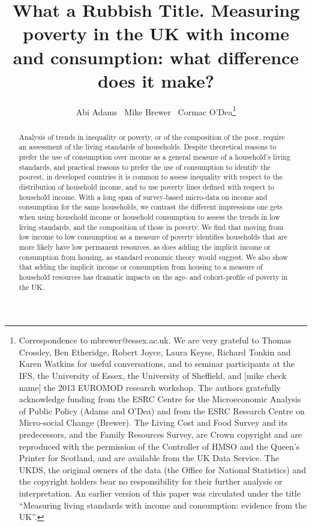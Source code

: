 \documentclass[11pt]{article} %
\title{What a Rubbish Title. Measuring poverty in the UK with income and consumption: what difference does it make?}
\author{Abi Adams \ Mike Brewer \ Cormac O'Dea\thanks{
Correspondence to mbrewer@essex.ac.uk. We are very grateful to Thomas Crossley, Ben Etheridge, Robert Joyce, Laura Keyse, Richard Tonkin and Karen Watkins for useful conversations, and to seminar participants at the IFS, the University of Essex, the University of Sheffield, and [mike check name] the 2013 EUROMOD research workshop. The authors gratefully acknowledge funding from the ESRC Centre for the Microeconomic Analysis of Public Policy (Adams and O'Dea) and from the ESRC Research Centre on Micro-social Change (Brewer). The Living Cost and Food Survey and its predecessors, and the Family Resources Survey, are Crown copyright and are reproduced with the permission of the Controller of HMSO and the Queen's Printer for Scotland, and are available from the UK Data Service. The UKDS, the original owners of the data (the Office for National Statistics) and the copyright holders bear no responsibility for their further analysis or interpretation. An earlier version of this paper was circulated under the title ``Measuring living standards with income and consumption: evidence from the UK''.}
}
\begin{document}
\maketitle

\begin{abstract}
%
Analysis of trends in inequality or poverty, or of the composition of the poor, require an assessment of the living standards of households. Despite theoretical reasons to prefer the use of consumption over income as a general measure of a household's living standards, and practical reasons to prefer the use of consumption to identify the poorest, in developed countries it is common to assess inequality with respect to the distribution of household income, and to use poverty lines defined with respect to household income. With a long span of survey-based micro-data on income and consumption for the same households, we contrast the different impressions one gets when using household income or household consumption to assess the trends in low living standards, and the composition of those in poverty. We find that moving from low income to low consumption as a measure of poverty identifies households that are more likely have low permanent resources, as does adding the implicit income or consumption from housing, as standard economic theory would suggest. We also show that adding the implicit income or consumption from housing to a measure of household resources has dramatic impacts on the age- and cohort-profile of poverty in the UK.
\end{abstract}









\newpage
%


\newpage
\appendix

%
\end{document}
